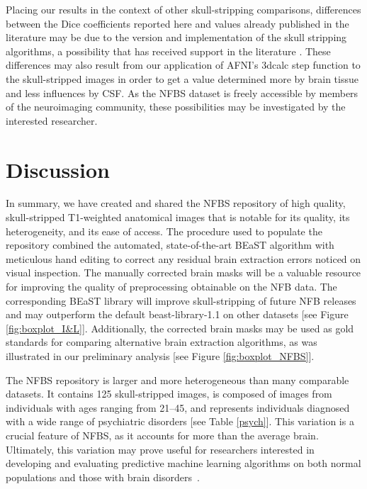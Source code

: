 Placing our results in the context of other skull-stripping comparisons, differences between the Dice coefficients reported here and values already published in the literature may be due to the version and implementation of the skull stripping algorithms, a possibility that has received support in the literature \cite{Iglesias2011}. These differences may also result from our application of AFNI's 3dcalc step function to the skull-stripped images in order to get a value determined more by brain tissue and less influences by CSF. As the NFBS dataset is freely accessible by members of the neuroimaging community, these possibilities may be investigated by the interested researcher.

\section*{Discussion}
In summary, we have created and shared the NFBS repository of high quality, skull-stripped T1-weighted anatomical images that is notable for its quality, its heterogeneity, and its ease of access. The procedure used to populate the repository combined the automated, state-of-the-art BEaST algorithm with  meticulous hand editing to correct any residual brain extraction errors noticed on visual inspection. The manually corrected brain masks will be a valuable resource for improving the quality of preprocessing obtainable on the NFB data. The corresponding BEaST library will improve skull-stripping of future NFB releases and may outperform the default beast-library-1.1 on other datasets [see Figure \ref{fig:boxplot_I&L}]. Additionally, the corrected brain masks may be used as gold standards for comparing alternative brain extraction algorithms, as was illustrated in our preliminary analysis [see Figure \ref{fig:boxplot_NFBS}].

The NFBS repository is larger and more heterogeneous than many comparable datasets. It contains 125 skull-stripped images, is composed of images from individuals with ages ranging from 21--45, and represents individuals diagnosed with a wide range of psychiatric disorders [see Table \ref{psych}]. This variation is a crucial feature of NFBS, as it accounts for more than the average brain. Ultimately, this variation may prove useful for researchers interested in developing and evaluating predictive machine learning algorithms on both normal populations and those with brain disorders~\cite{gabrieli2015prediction}.

